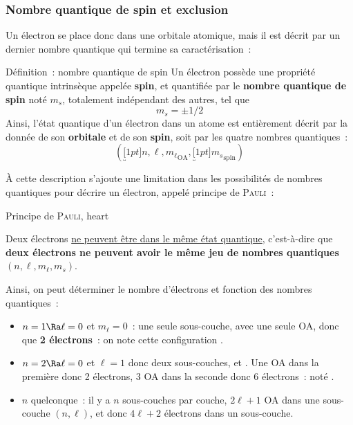 \documentclass[../main/main.tex]{subfiles}
\begin{document}
\subsubsection{Nombre quantique de spin et exclusion}
Un électron se place donc dans une orbitale atomique, mais il est décrit par un
dernier nombre quantique qui termine sa caractérisation~:

\begin{tdefi}{Définition~: nombre quantique de spin}
    Un électron possède une propriété quantique intrinsèque appelée
    \textbf{spin}, et quantifiée par le \textbf{nombre quantique de spin} noté
    $m_s$, totalement indépendant des autres, tel que
    \[m_s = \pm 1/2\]
    Ainsi, l'état quantique d'un électron dans un atome est entièrement décrit
    par la donnée de son \textbf{orbitale} et de son \textbf{spin}, soit par les
    quatre nombres quantiques~:
    \[
        \boxed{(\underbracket[1pt]{n,\ell,m_\ell}_{\text{OA}},
        \underbracket[1pt]{m_s}_{\text{spin}})}
    \]
\end{tdefi}

À cette description s'ajoute une limitation dans les possibilités de nombres
quantiques pour décrire un électron, appelé principe de \textsc{Pauli}~:

\begin{tprop}{Principe de \textsc{Pauli}, heart}
    \begin{center}
        Deux électrons \ul{ne peuvent être dans le même état quantique},
        c'est-à-dire que \textbf{deux électrons ne peuvent avoir le même jeu de
        nombres quantiques} $(n,\ell,m_\ell,m_s)$.
    \end{center}
\end{tprop}

Ainsi, on peut déterminer le nombre d'électrons et fonction des nombres
quantiques~:
\begin{itemize}
    \item $n = 1 \Ra \ell = 0$ et $m_\ell = 0$~: une seule
        sous-couche,  avec une seule OA, donc que \textbf{2
        électrons}~: on note cette configuration .
    \item $n = 2 \Ra \ell = 0$ et $\ell = 1$ donc deux sous-couches,  et 
        . Une OA dans la première donc 2 électrons, 3 OA dans la
        seconde donc 6 électrons~: noté .
    \item $n$ quelconque~: il y a $n$ sous-couches par couche, $2\ell+1$ OA
        dans une sous-couche $(n,\ell)$, et donc $4\ell+2$ électrons dans un
        sous-couche.
\end{itemize} \smallbreak
\end{document}
